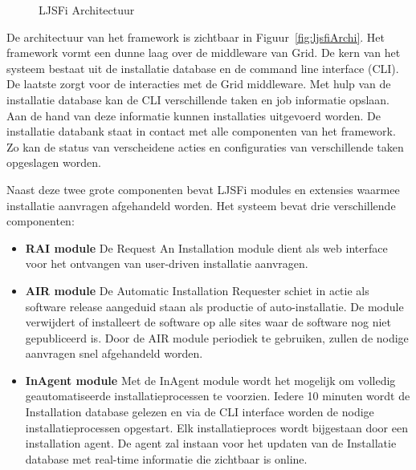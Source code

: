 \begin{figure}[!ht]
\centering
{}
\caption{LJSFi Architectuur \citep{salvo2008atlas}}
\label{fig:ljsfiArchi}
\end{figure}

De architectuur van het framework is zichtbaar in Figuur~\vref{fig:ljsfiArchi}.
Het framework vormt een dunne laag over de middleware van Grid.
De kern van het systeem bestaat uit de installatie database en de command line interface (CLI).
De laatste zorgt voor de interacties met de Grid middleware.
Met hulp van de installatie database kan de CLI verschillende taken en job informatie opslaan.
Aan de hand van deze informatie kunnen installaties uitgevoerd worden.
De installatie databank staat in contact met alle componenten van het framework.
Zo kan de status van verscheidene acties en configuraties van verschillende taken opgeslagen worden.

Naast deze twee grote componenten bevat LJSFi modules en extensies waarmee installatie aanvragen afgehandeld worden.
Het systeem bevat drie verschillende componenten:
\begin{itemize}
\item \textbf{RAI module} De Request An Installation module dient als web interface voor het ontvangen van user-driven installatie aanvragen.
\item \textbf{AIR module} De Automatic Installation Requester schiet in actie als software release aangeduid staan als productie of auto-installatie.
De module verwijdert of installeert de software op alle sites waar de software nog niet gepubliceerd is.
Door de AIR module periodiek te gebruiken, zullen de nodige aanvragen snel afgehandeld worden.
\item \textbf{InAgent module} Met de InAgent module wordt het mogelijk om volledig geautomatiseerde installatieprocessen te voorzien.
Iedere 10 minuten wordt de Installation database gelezen en via de CLI interface worden de nodige installatieprocessen opgestart.
Elk installatieproces wordt bijgestaan door een installation agent.
De agent zal instaan voor het updaten van de Installatie database met real-time informatie die zichtbaar is online.
\end{itemize}

